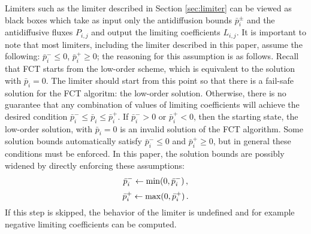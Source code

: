 Limiters such as the limiter described in Section \ref{sec:limiter} can be
viewed as black boxes which take as input only the antidiffusion bounds
$\bar{p}_i^\pm$ and the antidiffusive fluxes $P_{i,j}$ and output the
limiting coefficients $L_{i,j}$. It is important to note that most limiters,
including the limiter described in this paper, assume the following:
$\bar{p}_i^-\leq 0$, $\bar{p}_i^+\geq 0$; the reasoning for this assumption
is as follows. Recall that FCT starts from the
low-order scheme, which is equivalent to the solution with $\bar{p}_i=0$.
The limiter should start from this point so that there is a fail-safe solution
for the FCT algoritm: the low-order solution. Otherwise, there is no guarantee
that any combination of values of limiting coefficients will achieve
the desired condition $\bar{p}_i^-\leq \bar{p}_i\leq \bar{p}_i^+$. If
$\bar{p}_i^- > 0$ or $\bar{p}_i^+ < 0$, then the starting state, the low-order
solution, with $\bar{p}_i=0$ is an invalid solution of the FCT algorithm.
Some solution bounds automatically satisfy $\bar{p}_i^-\leq 0$ and $\bar{p}_i^+\geq 0$,
but in general these conditions must be enforced. In this paper, the solution
bounds are possibly widened by directly enforcing these assumptions:
\begin{equation}
  \bar{p}_i^- \gets \min(0,\bar{p}_i^-) \,,
\end{equation}
\begin{equation}
  \bar{p}_i^+ \gets \max(0,\bar{p}_i^+) \,.
\end{equation}
If this step is skipped, the behavior of the limiter is undefined and for example
negative limiting coefficients can be computed.


